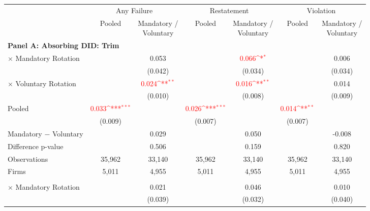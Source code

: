 \documentclass[10pt]{article}
\newcommand{\sym}[1]{\textsuperscript{#1}}
\begin{document}
\begin{minipage}{19cm}\fontsize{10}{12}\selectfont\setlength{\tabcolsep}{4pt}\renewcommand{\arraystretch}{1.12}


\def\sym#1{\ifmmode^{#1}\else\(^{#1}\)\fi}
\centering
{}
\label{tab:absorbing-transition-bad-historical-restatement-downgrade-no-auditfirm-fe}
\begin{threeparttable}

\begin{tabular}{l cc cc cc}
\toprule
 & \multicolumn{2}{c}{Any Failure} & \multicolumn{2}{c}{Restatement} & \multicolumn{2}{c}{Violation} \\
\cmidrule(lr){2-3}\cmidrule(lr){4-5}\cmidrule(lr){6-7}
 & Pooled & \shortstack{Mandatory /\\Voluntary} & Pooled & \shortstack{Mandatory /\\Voluntary} & Pooled & \shortstack{Mandatory /\\Voluntary} \\
\midrule
\multicolumn{7}{l}{\textbf{Panel A: Absorbing DID: Trim}} \\
$\times$ Mandatory Rotation &  & 0.053 &  & \textcolor{red}{0.066\sym{*}} &  & 0.006 \\
 &  & (0.042) &  & (0.034) &  & (0.034) \\
$\times$ Voluntary Rotation &  & \textcolor{red}{0.024\sym{**}} &  & \textcolor{red}{0.016\sym{**}} &  & 0.014 \\
 &  & (0.010) &  & (0.008) &  & (0.009) \\
Pooled & \textcolor{red}{0.033\sym{***}} &  & \textcolor{red}{0.026\sym{***}} &  & \textcolor{red}{0.014\sym{**}} &  \\
 & (0.009) &  & (0.007) &  & (0.007) &  \\
Mandatory $-$ Voluntary &  & 0.029 &  & 0.050 &  & -0.008 \\
Difference p-value &  & 0.506 &  & 0.159 &  & 0.820 \\
Observations & 35,962 & 33,140 & 35,962 & 33,140 & 35,962 & 33,140 \\
Firms & 5,011 & 4,955 & 5,011 & 4,955 & 5,011 & 4,955 \\
\addlinespace
\multicolumn{7}{l}{\textbf{Panel B: Absorbing DID: Strict}} \\
$\times$ Mandatory Rotation &  & 0.021 &  & 0.046 &  & 0.010 \\
 &  & (0.039) &  & (0.032) &  & (0.040) \\

\end{tabular}
\end{threeparttable}
\end{minipage}
\end{document}
